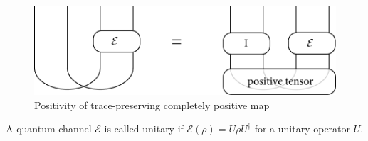 \documentclass[12pt]{book}
\begin{document}
\begin{figure}[htb!]
	\centering  
	\includegraphics[scale=0.6 ]{fig/complete_positive.pdf}  
	\caption{Positivity of trace-preserving completely positive map}
	\label{fig:complete_positive}
\end{figure}

\begin{definition}
	A quantum channel $\mathcal E$ is called unitary if $\mathcal E(\rho)=U\rho U^\dagger$ for a unitary operator $U$.
\end{definition}
\end{document}
